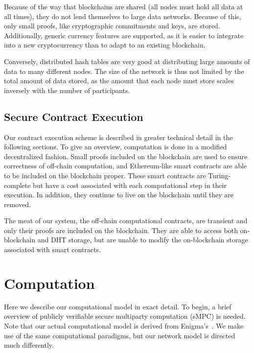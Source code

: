 \documentclass[journal,11pt]{IEEEtran}
\begin{document}
\par Because of the way that blockchains are shared (all nodes must hold all data at all times), they do not lend themselves to large data networks. Because of this, only small proofs, like cryptographic commitments and keys, are stored. Additionally, generic currency features are supported, as it is easier to integrate into a new cryptocurrency than to adapt to an existing blockchain.

\par Conversely, distributed hash tables are very good at distributing large amounts of data to many different nodes. The size of the network is thus not limited by the total amount of data stored, as the amount that each node must store scales inversely with the number of participants.

\subsection{Secure Contract Execution}
\par Our contract execution scheme is described in greater technical detail in the following sections. To give an overview, computation is done in a modified decentralized fashion. Small proofs included on the blockchain are used to ensure correctness of off-chain computation, and Ethereum-like smart contracts are able to be included on the blockchain proper. These smart contracts are Turing-complete but have a cost associated with each computational step in their execution. In addition, they continue to live on the blockchain until they are removed.

\par The meat of our system, the off-chain computational contracts, are transient and only their proofs are included on the blockchain. They are able to access both on-blockchain and DHT storage, but are unable to modify the on-blockchain storage associated with smart contracts.

\section{Computation}
\par Here we describe our computational model in exact detail. To begin, a brief overview of publicly verifiable secure multiparty computation (sMPC) is needed. Note that our actual computational model is derived from Enigma's~\cite{Zyskind2015}. We make use of the same computational paradigms, but our network model is directed much differently. 
\end{document}
